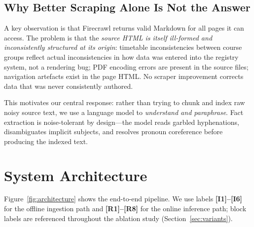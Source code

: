 \documentclass[sigconf,natbib=true]{acmart}
\begin{document}
\subsection{Why Better Scraping Alone Is Not the Answer}

A key observation is that Firecrawl returns valid Markdown for all pages it can access.
The problem is that the \emph{source HTML is itself ill-formed and inconsistently structured at its origin}: timetable inconsistencies between course groups reflect actual inconsistencies in how data was entered into the registry system, not a rendering bug; PDF encoding errors are present in the source files; navigation artefacts exist in the page HTML.
No scraper improvement corrects data that was never consistently authored.

This motivates our central response: rather than trying to chunk and index raw noisy source text, we use a language model to \emph{understand and paraphrase}.
Fact extraction is noise-tolerant by design---the model reads garbled hyphenations, disambiguates implicit subjects, and resolves pronoun coreference before producing the indexed text.

\section{System Architecture}
\label{sec:architecture}

Figure~\ref{fig:architecture} shows the end-to-end pipeline.
We use labels \textbf{[I1]--[I6]} for the offline ingestion path and \textbf{[R1]--[R8]} for the online inference path; block labels are referenced throughout the ablation study (Section~\ref{sec:variants}).
\end{document}
